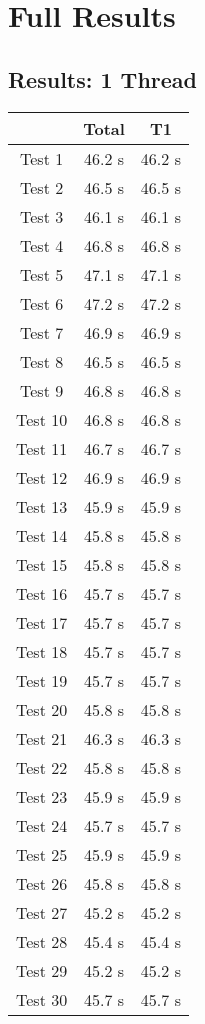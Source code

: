 \documentclass[12pt]{article}
\begin{document}
\section{Full Results}

\subsection{Results: 1 Thread}

\begin{tabular}{ | c | c | c | }
  \hline	 & Total & T1 \\ \hline 
  Test 1& 46.2 s& 46.2 s\\ \hline 
  Test 2& 46.5 s& 46.5 s\\ \hline 
  Test 3& 46.1 s& 46.1 s\\ \hline 
  Test 4& 46.8 s& 46.8 s\\ \hline 
  Test 5& 47.1 s& 47.1 s\\ \hline 
  Test 6& 47.2 s& 47.2 s\\ \hline 
  Test 7& 46.9 s& 46.9 s\\ \hline 
  Test 8& 46.5 s& 46.5 s\\ \hline 
  Test 9& 46.8 s& 46.8 s\\ \hline 
  Test 10& 46.8 s& 46.8 s\\ \hline 
  Test 11& 46.7 s& 46.7 s\\ \hline 
  Test 12& 46.9 s& 46.9 s\\ \hline 
  Test 13& 45.9 s& 45.9 s\\ \hline 
  Test 14& 45.8 s& 45.8 s\\ \hline 
  Test 15& 45.8 s& 45.8 s\\ \hline 
  Test 16& 45.7 s& 45.7 s\\ \hline 
  Test 17& 45.7 s& 45.7 s\\ \hline 
  Test 18& 45.7 s& 45.7 s\\ \hline 
  Test 19& 45.7 s& 45.7 s\\ \hline 
  Test 20& 45.8 s& 45.8 s\\ \hline 
  Test 21& 46.3 s& 46.3 s\\ \hline 
  Test 22& 45.8 s& 45.8 s\\ \hline 
  Test 23& 45.9 s& 45.9 s\\ \hline 
  Test 24& 45.7 s& 45.7 s\\ \hline 
  Test 25& 45.9 s& 45.9 s\\ \hline 
  Test 26& 45.8 s& 45.8 s\\ \hline 
  Test 27& 45.2 s& 45.2 s\\ \hline 
  Test 28& 45.4 s& 45.4 s\\ \hline 
  Test 29& 45.2 s& 45.2 s\\ \hline 
  Test 30& 45.7 s& 45.7 s\\ \hline 
  \end{tabular}
  
\end{document}
